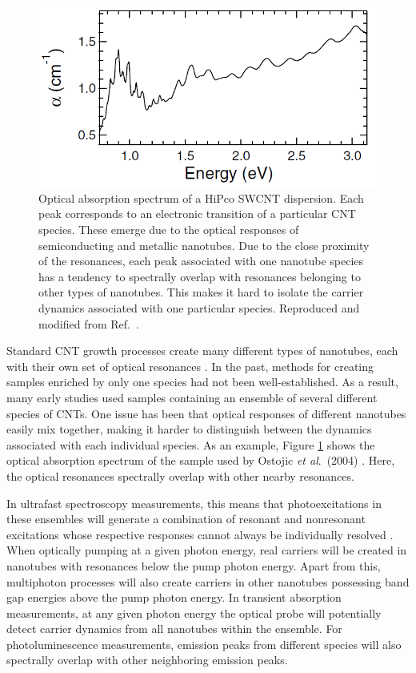 \begin{figure}[ht]
	\centering
	\includegraphics[scale=0.7]{images/chapter_intro/abs_gordana_modified}
	\caption{Optical absorption spectrum of a HiPco SWCNT dispersion. Each peak corresponds to an electronic transition of a particular CNT species. These emerge due to the optical responses of semiconducting and metallic nanotubes. Due to the close proximity of the resonances, each peak associated with one nanotube species has a tendency to spectrally overlap with resonances belonging to other types of nanotubes. This makes it hard to isolate the carrier dynamics associated with one particular species. Reproduced and modified from Ref.\ \cite{ostojic2004interband}.}
	\label{fig:abs_gordana_intro}
\end{figure}

Standard CNT growth processes create many different types of nanotubes, each with their own set of optical resonances \cite{prasek2011methods}. In the past, methods for creating samples enriched by only one species had not been well-established. As a result, many early studies used samples containing an ensemble of several different species of CNTs. One issue has been that optical responses of different nanotubes easily mix together, making it harder to distinguish between the dynamics associated with each individual species. As an example, Figure \ref{fig:abs_gordana_intro} shows the optical absorption spectrum of the sample used by Ostojic \textit{et al}.\ (2004) \cite{ostojic2004interband}. Here, the optical resonances spectrally overlap with other nearby resonances.

In ultrafast spectroscopy measurements, this means that photoexcitations in these ensembles will generate a combination of resonant and nonresonant excitations whose respective responses cannot always be individually resolved \cite{ostojic2004interband}. When optically pumping at a given photon energy, real carriers will be created in nanotubes with resonances below the pump photon energy. Apart from this, multiphoton processes will also create carriers in other nanotubes possessing band gap energies above the pump photon energy. In transient absorption measurements, at any given photon energy the optical probe will potentially detect carrier dynamics from all nanotubes within the ensemble. For photoluminescence measurements, emission peaks from different species will also spectrally overlap with other neighboring emission peaks.

